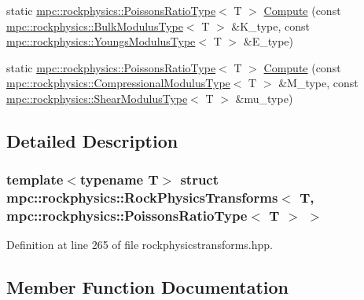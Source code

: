 \begin{DoxyCompactItemize}
\item 
static \mbox{\hyperlink{structmpc_1_1rockphysics_1_1_poissons_ratio_type}{mpc\+::rockphysics\+::\+Poissons\+Ratio\+Type}}$<$ T $>$ \mbox{\hyperlink{structmpc_1_1rockphysics_1_1_rock_physics_transforms_3_01_t_00_01mpc_1_1rockphysics_1_1_poissons_ratio_type_3_01_t_01_4_01_4_a374c2b89bf05cb9d9fd5833ca114b65a}{Compute}} (const \mbox{\hyperlink{structmpc_1_1rockphysics_1_1_bulk_modulus_type}{mpc\+::rockphysics\+::\+Bulk\+Modulus\+Type}}$<$ T $>$ \&K\+\_\+type, const \mbox{\hyperlink{structmpc_1_1rockphysics_1_1_youngs_modulus_type}{mpc\+::rockphysics\+::\+Youngs\+Modulus\+Type}}$<$ T $>$ \&E\+\_\+type)
\item 
static \mbox{\hyperlink{structmpc_1_1rockphysics_1_1_poissons_ratio_type}{mpc\+::rockphysics\+::\+Poissons\+Ratio\+Type}}$<$ T $>$ \mbox{\hyperlink{structmpc_1_1rockphysics_1_1_rock_physics_transforms_3_01_t_00_01mpc_1_1rockphysics_1_1_poissons_ratio_type_3_01_t_01_4_01_4_a3c84bba0a1fa50773de188038b50719e}{Compute}} (const \mbox{\hyperlink{structmpc_1_1rockphysics_1_1_compressional_modulus_type}{mpc\+::rockphysics\+::\+Compressional\+Modulus\+Type}}$<$ T $>$ \&M\+\_\+type, const \mbox{\hyperlink{structmpc_1_1rockphysics_1_1_shear_modulus_type}{mpc\+::rockphysics\+::\+Shear\+Modulus\+Type}}$<$ T $>$ \&mu\+\_\+type)
\end{DoxyCompactItemize}


\subsection{Detailed Description}
\subsubsection*{template$<$typename T$>$\newline
struct mpc\+::rockphysics\+::\+Rock\+Physics\+Transforms$<$ T, mpc\+::rockphysics\+::\+Poissons\+Ratio\+Type$<$ T $>$ $>$}



Definition at line 265 of file rockphysicstransforms.\+hpp.



\subsection{Member Function Documentation}
\mbox{\label{structmpc_1_1rockphysics_1_1_rock_physics_transforms_3_01_t_00_01mpc_1_1rockphysics_1_1_poissons_ratio_type_3_01_t_01_4_01_4_a3a8b7dbc8559bcc4151c226dd01a9f27}} 
